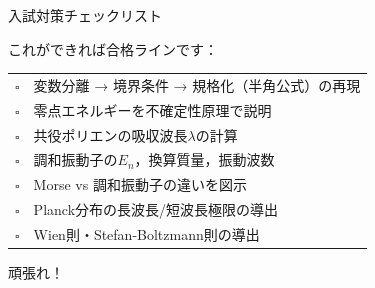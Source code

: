 \documentclass[aspectratio=169, 11pt]{beamer}
\begin{document}
\begin{frame}[shrink=5]{入試対策チェックリスト}

\begin{block}{これができれば合格ラインです：}
  {\small
  \begin{tabular}{cl}
    $\square$ & 変数分離 → 境界条件 → 規格化（半角公式）の再現 \\
    $\square$ & 零点エネルギーを不確定性原理で説明 \\
    $\square$ & 共役ポリエンの吸収波長$\lambda$の計算 \\
    $\square$ & 調和振動子の$E_n$，換算質量，振動波数 \\
    $\square$ & Morse vs 調和振動子の違いを図示 \\
    $\square$ & Planck分布の長波長/短波長極限の導出 \\
    $\square$ & Wien則・Stefan-Boltzmann則の導出 \\
  \end{tabular}
  }
\end{block}
\end{frame}

\begin{frame}[standout]
  頑張れ！
\end{frame}
\end{document}
